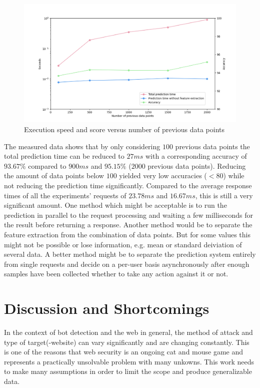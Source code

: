 \documentclass[
    fontsize=12pt,
    headings=small,
    parskip=half,           %
    bibliography=totoc,
    numbers=noenddot,       %
    open=any,               %
    final                   %
]{scrreprt}
\begin{document}
\begin{figure}[h]
	\includegraphics[width=\textwidth]{figures/speed_per_dp_count.png}
	\caption{Execution speed and score versus number of previous data points}
	\label{fig:speed_per_dp_count}
\end{figure}

The measured data shows that by only considering $100$ previous data points the total prediction time can be reduced to $27ms$ with a corresponding accuracy of $93.67\%$ compared to $900ms$ and $95.15\%$ ($2000$ previous data points). Reducing the amount of data points below $100$ yielded very low accuracies ($<80$) while not reducing the prediction time significantly. Compared to the average response times of all the experiments' requests of $23.78ms$ and $16.67ms$, this is still a very significant amount. One method which might be acceptable is to run the prediction in parallel to the request processing and waiting a few milliseconds for the result before returning a response. Another method would be to separate the feature extraction from the combination of data points. But for some values this might not be possible or lose information, e.g. mean or standard deiviation of several data.
A better method might be to separate the prediction system entirely from single requests and decide on a per-user basis asynchronously after enough samples have been collected whether to take any action against it or not.




\chapter{Discussion and Shortcomings}
In the context of bot detection and the web in general, the method of attack and type of target(-website) can vary significantly and are changing constantly. This is one of the reasons that web security is an ongoing cat and mouse game and represents a practically unsolvable problem with many unkowns. This work needs to make many assumptions in order to limit the scope and produce generalizable data.
\end{document}
